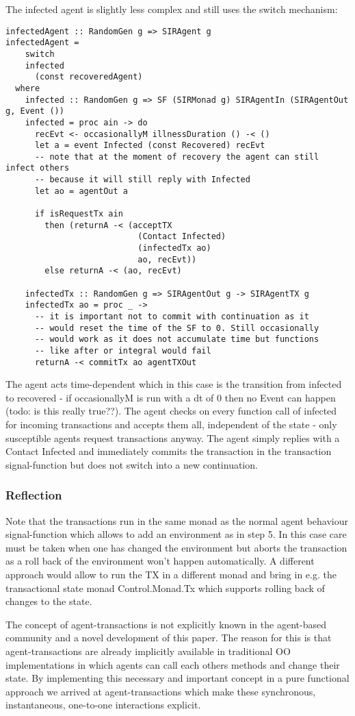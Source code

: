 The infected agent is slightly less complex and still uses the switch mechanism:
\begin{verbatim}
infectedAgent :: RandomGen g => SIRAgent g
infectedAgent = 
    switch
    infected 
      (const recoveredAgent)
  where
    infected :: RandomGen g => SF (SIRMonad g) SIRAgentIn (SIRAgentOut g, Event ())
    infected = proc ain -> do
      recEvt <- occasionallyM illnessDuration () -< ()
      let a = event Infected (const Recovered) recEvt
      -- note that at the moment of recovery the agent can still infect others
      -- because it will still reply with Infected
      let ao = agentOut a

      if isRequestTx ain 
        then (returnA -< (acceptTX 
                           (Contact Infected)
                           (infectedTx ao)
                           ao, recEvt))
        else returnA -< (ao, recEvt)

    infectedTx :: RandomGen g => SIRAgentOut g -> SIRAgentTX g
    infectedTx ao = proc _ ->
      -- it is important not to commit with continuation as it
      -- would reset the time of the SF to 0. Still occasionally
      -- would work as it does not accumulate time but functions
      -- like after or integral would fail
      returnA -< commitTx ao agentTXOut
\end{verbatim}

The agent acts time-dependent which in this case is the transition from infected to recovered - if occasionallyM is run with a dt of 0 then no Event can happen (todo: is this really true??). The agent checks on every function call of infected for incoming transactions and accepts them all, independent of the state - only susceptible agents request transactions anyway. The agent simply replies with a Contact Infected and immediately commits the transaction in the transaction signal-function but does not switch into a new continuation.

\subsubsection{Reflection}
Note that the transactions run in the same monad as the normal agent behaviour signal-function which allows to add an environment as in step 5. In this case care must be taken when one has changed the environment but aborts the transaction as a roll back of the environment won't happen automatically. A different approach would allow to run the TX in a different monad and bring in e.g. the  transactional state monad Control.Monad.Tx which supports rolling back of changes to the state.

The concept of agent-transactions is not explicitly known in the agent-based community and a novel development of this paper. The reason for this is that agent-transactions are already implicitly available in traditional OO implementations in which agents can call each others methods and change their state. By implementing this necessary and important concept in a pure functional approach we arrived at agent-transactions which make these synchronous, instantaneous, one-to-one interactions explicit.